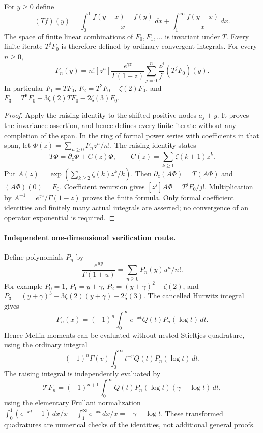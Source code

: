 \begin{corollary}
For $y\ge0$ define
\[
 (Tf)(y)=\int_0^1\frac{f(y+x)-f(y)}x\,dx
              +\int_1^\infty\frac{f(y+x)}x\,dx.
\]
The space of finite linear combinations of $F_0,F_1,\ldots$ is invariant under $T$.
Every finite iterate $T^jF_0$ is therefore defined by ordinary
convergent integrals. For every $n\ge0$,
\begin{equation}\label{stmell:finite-operator}
 F_n(y)=n![z^n]\frac{e^{\gamma z}}{\Gamma(1-z)}
             \sum_{j=0}^n\frac{z^j}{j!}(T^jF_0)(y).
\end{equation}
In particular $F_1=TF_0$,
$F_2=T^2F_0-\zeta(2)F_0$, and
$F_3=T^3F_0-3\zeta(2)TF_0-2\zeta(3)F_0$.
\end{corollary}
\begin{proof}
Apply the raising identity to the shifted positive nodes $a_j+y$.
It proves the invariance assertion, and hence defines every finite
iterate without any completion of the span. In the ring of formal
power series with coefficients in that span, let
$\Phi(z)=\sum_{n\ge0}F_nz^n/n!$. The raising identity states
\[
 T\Phi=\partial_z\Phi+C(z)\Phi,
 \qquad C(z)=\sum_{k\ge1}\zeta(k+1)z^k.
\]
Put $A(z)=\exp(\sum_{k\ge2}\zeta(k)z^k/k)$.
Then $\partial_z(A\Phi)=T(A\Phi)$ and $(A\Phi)(0)=F_0$.
Coefficient recursion gives
$[z^j]A\Phi=T^jF_0/j!$. Multiplication by
$A^{-1}=e^{\gamma z}/\Gamma(1-z)$ proves the finite formula.
Only formal coefficient identities and finitely many actual
integrals are asserted; no convergence of an operator exponential is
required.
\end{proof}

\paragraph{Independent one-dimensional verification route.}
Define polynomials $P_n$ by
\[
 \frac{e^{uy}}{\Gamma(1+u)}=\sum_{n\ge0}P_n(y)u^n/n!.
\]
For example $P_0=1$, $P_1=y+\gamma$,
$P_2=(y+\gamma)^2-\zeta(2)$, and
$P_3=(y+\gamma)^3-3\zeta(2)(y+\gamma)+2\zeta(3)$.
The cancelled Hurwitz integral gives
\[
 F_n(x)=(-1)^n\int_0^\infty e^{-xt}Q(t)P_n(\log t)\,dt.
\]
Hence Mellin moments can be evaluated without nested Stieltjes
quadrature, using the ordinary integral
\[
 (-1)^n\Gamma(v)\int_0^\infty t^{-v}Q(t)P_n(\log t)\,dt.
\]
The raising integral is independently evaluated by
\[
 \mathcal TF_n=(-1)^{n+1}\int_0^\infty
 Q(t)P_n(\log t)(\gamma+\log t)\,dt,
\]
using the elementary Frullani normalization
$\int_0^1(e^{-xt}-1)\,dx/x+\int_1^\infty e^{-xt}\,dx/x
=-\gamma-\log t$. These transformed quadratures are numerical
checks of the identities, not additional general proofs.

